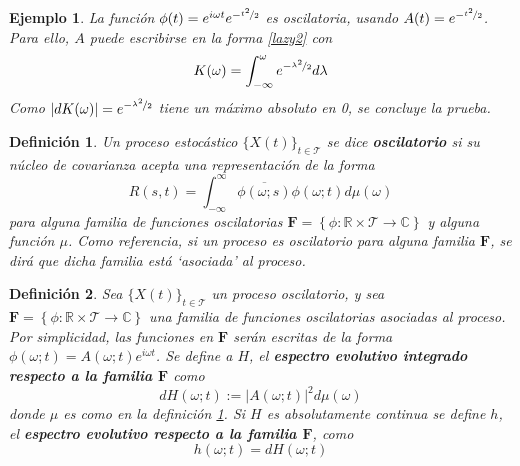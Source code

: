 \documentclass[12pt,letterpaper]{book}
\newtheorem{definicion}{Definición}[chapter]
\newtheorem{ejemplo}{Ejemplo}[chapter]
\newcommand{\R}{\mathbb{R}}
\newcommand{\C}{\mathbb{C}}
\newcommand{\intR}{\int_{-\infty}^{\infty}}
\newcommand{\ef}{\mathbf{F}}
\newcommand{\abso}[1]{\left| #1 \right|}
\newcommand{\xt}{$\{X(t)\}_{t\in \mathcal{T}}$ }
\begin{document}
\begin{ejemplo}
La función $\phi(t) = e^{i \omega t} e^{-\nicefrac{t^2}{2}}$ es oscilatoria, usando $A(t) = e^{-\nicefrac{t^2}{2}}$.
% 
Para ello, $A$ puede escribirse en la forma \ref{lazy2} con 
\begin{equation}
K(\omega) = \int_{-\infty}^{\omega}  e^{-\nicefrac{\lambda^2}{2}} d\lambda
\end{equation}
Como $\abso{dK(\omega)} = e^{-\nicefrac{\lambda^2}{2}}$ tiene un máximo absoluto en 0, se concluye la prueba. 
\label{ejemplo:oscilatorios2}
\end{ejemplo}




\begin{definicion}
Un proceso estocástico \xt se dice \textbf{oscilatorio} si su núcleo de covarianza acepta una representación de la forma
\begin{equation}
R(s,t) = \intR \overline{\phi(\omega;s)}\phi(\omega;t) d\mu(\omega)
\end{equation}
para alguna familia de funciones oscilatorias $\ef = \left\{ \phi: \R \times \mathcal{T} \rightarrow \C \right\}$ y alguna función $\mu$.
%
Como referencia, si un proceso es oscilatorio para alguna familia $\ef$, se dirá que dicha familia está \textit{`asociada'} al proceso.
\label{def:proc_oscilatorio}
\end{definicion}

\begin{definicion}
Sea \xt un proceso oscilatorio, y sea $\ef = \left\{ \phi: \R \times \mathcal{T} \rightarrow \C \right\}$ una familia de funciones oscilatorias asociadas al proceso.
%
Por simplicidad, las funciones en $\ef$ serán escritas de la forma $\phi(\omega;t) = A(\omega;t) e^{i \omega t}$.
% 
Se define a $H$, el \textbf{espectro evolutivo integrado respecto a la familia $\ef$} como
\begin{equation}
dH(\omega; t) := \abso{A(\omega;t)}^{2} d\mu(\omega)
\end{equation}
donde $\mu$ es como en la definición \ref{def:proc_oscilatorio}.
%
Si $H$ es absolutamente continua se define $h$, el \textbf{espectro evolutivo respecto a la familia $\ef$}, como
\begin{equation}
h(\omega; t) = dH(\omega; t)
\end{equation}
\label{def:espectro}
\end{definicion}
\end{document}
